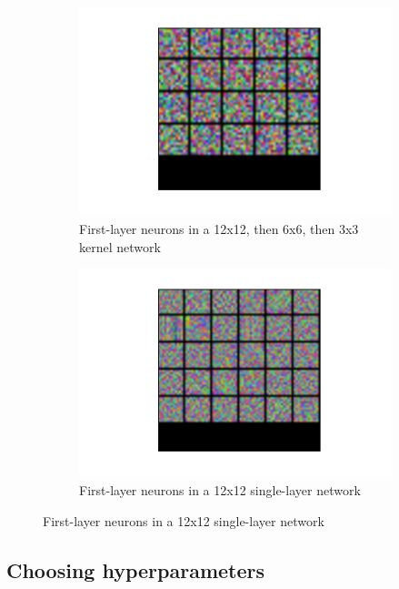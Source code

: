 \documentclass[10pt]{article}
\begin{document}
\begin{figure}[!ht]
\centering
\begin{subfigure}[t]{0.3\textwidth}
	\centering
	\includegraphics[width=\textwidth]{12_6_3_layer1.pdf}
	\caption{First-layer neurons in a 12x12, then 6x6, then 3x3 kernel network}
	\label{fig:12_6_3}
\end{subfigure}
\hspace{3mm}
\begin{subfigure}[t]{0.288\textwidth}
	\centering
	\includegraphics[width=\textwidth]{12_kernel_3_kernel_2_dropout_10000_30_each_1e3_iter_90000.pdf}
	\caption{First-layer neurons in a 12x12 single-layer network}
	\label{fig:12}
\end{subfigure}
\end{figure}

\subsection{Choosing hyperparameters}
\end{document}
